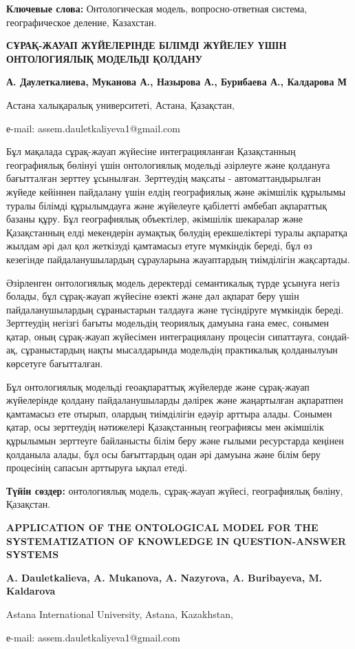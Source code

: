 {\bfseries Ключевые слова:} Онтологическая модель, вопросно-ответная
система, географическое деление, Казахстан.

\begin{center}
{\large\bfseries СҰРАҚ-ЖАУАП ЖҮЙЕЛЕРІНДЕ БІЛІМДІ ЖҮЙЕЛЕУ ҮШІН ОНТОЛОГИЯЛЫҚ МОДЕЛЬДІ ҚОЛДАНУ}

{\bfseries А. Даулеткалиева, Муканова А., Назырова А., Бурибаева А.,
Калдарова М}

Астана халықаралық университеті, Астана, Қазақстан,

е-mail: assem.dauletkaliyeva1@gmail.com
\end{center}

Бұл мақалада сұрақ-жауап жүйесіне интеграцияланған Қазақстанның
географиялық бөлінуі үшін онтологиялық модельді әзірлеуге және қолдануға
бағытталған зерттеу ұсынылған. Зерттеудің мақсаты - автоматтандырылған
жүйеде кейіннен пайдалану үшін елдің географиялық және әкімшілік
құрылымы туралы білімді құрылымдауға және жүйелеуге қабілетті әмбебап
ақпараттық базаны құру. Бұл географиялық объектілер, әкімшілік шекаралар
және Қазақстанның елді мекендерін аумақтық бөлудің ерекшеліктері туралы
ақпаратқа жылдам әрі дәл қол жеткізуді қамтамасыз етуге мүмкіндік
береді, бұл өз кезегінде пайдаланушылардың сұрауларына жауаптардың
тиімділігін жақсартады.

Әзірленген онтологиялық модель деректерді семантикалық түрде ұсынуға
негіз болады, бұл сұрақ-жауап жүйесіне өзекті және дәл ақпарат беру үшін
пайдаланушылардың сұраныстарын талдауға және түсіндіруге мүмкіндік
береді. Зерттеудің негізгі бағыты модельдің теориялық дамуына ғана емес,
сонымен қатар, оның сұрақ-жауап жүйесімен интеграциялану процесін
сипаттауға, сондай-ақ, сұраныстардың нақты мысалдарында модельдің
практикалық қолданылуын көрсетуге бағытталған.

Бұл онтологиялық модельді геоақпараттық жүйелерде және сұрақ-жауап
жүйелерінде қолдану пайдаланушыларды дәлірек және жаңартылған ақпаратпен
қамтамасыз ете отырып, олардың тиімділігін едәуір арттыра алады. Сонымен
қатар, осы зерттеудің нәтижелері Қазақстанның географиясы мен әкімшілік
құрылымын зерттеуге байланысты білім беру және ғылыми ресурстарда
кеңінен қолданыла алады, бұл осы бағыттардың одан әрі дамуына және білім
беру процесінің сапасын арттыруға ықпал етеді.

{\bfseries Түйін сөздер:} онтологиялық модель, сұрақ-жауап жүйесі,
географиялық бөліну, Қазақстан.

\begin{center}
{\large\bfseries APPLICATION OF THE ONTOLOGICAL MODEL FOR THE SYSTEMATIZATION OF
KNOWLEDGE IN QUESTION-ANSWER SYSTEMS}

{\bfseries A. Dauletkalieva, A. Mukanova, A. Nazyrova, A. Buribayeva, M.
Kaldarova}

Astana International University, Astana, Kazakhstan,

е-mail: assem.dauletkaliyeva1@gmail.com
\end{center}

